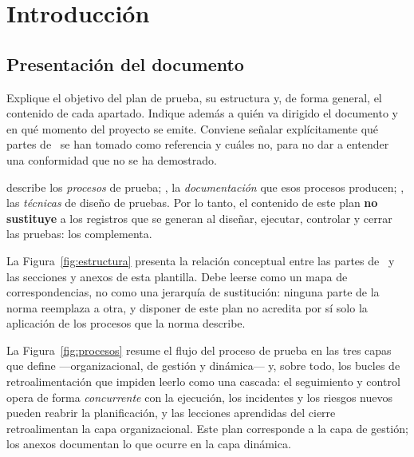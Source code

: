 \section{Introducción}

\subsection{Presentación del documento}

\begin{instruccion}
Explique el objetivo del plan de prueba, su estructura y, de forma general, el contenido de
cada apartado. Indique además a quién va dirigido el documento y en qué momento del proyecto
se emite. Conviene señalar explícitamente qué partes de \norma\ se han tomado como referencia
y cuáles no, para no dar a entender una conformidad que no se ha demostrado.
\end{instruccion}


\begin{notanormativa}
 describe los \emph{procesos} de prueba; , la \emph{documentación} que
esos procesos producen; , las \emph{técnicas} de diseño de pruebas. Por lo tanto,
el contenido de este plan \textbf{no sustituye} a los registros que se generan al diseñar,
ejecutar, controlar y cerrar las pruebas: los complementa.
\end{notanormativa}

\ifmostrardiagramas


La Figura~\ref{fig:estructura} presenta la relación conceptual entre las partes de \norma\ y
las secciones y anexos de esta plantilla. Debe leerse como un mapa de correspondencias, no
como una jerarquía de sustitución: ninguna parte de la norma reemplaza a otra, y disponer de
este plan no acredita por sí solo la aplicación de los procesos que la norma describe.



La Figura~\ref{fig:procesos} resume el flujo del proceso de prueba en las tres capas que define
 —organizacional, de gestión y dinámica— y, sobre todo, los bucles de
retroalimentación que impiden leerlo como una cascada: el seguimiento y control opera de forma
\emph{concurrente} con la ejecución, los incidentes y los riesgos nuevos pueden reabrir la
planificación, y las lecciones aprendidas del cierre retroalimentan la capa organizacional. Este
plan corresponde a la capa de gestión; los anexos documentan lo que ocurre en la capa dinámica.
\fi

